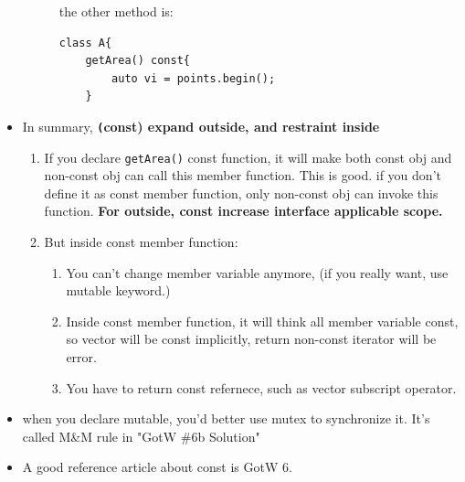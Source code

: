 \documentclass[a4paper,11pt,twoside]{book}
\begin{document}
\begin{itemize}
\begin{description}
		the other method is:	
\begin{lstlisting}[numbers=none]
class A{
	getArea() const{
		auto vi = points.begin();
    }
\end{lstlisting}
	
\end{description}
			
	\item In summary, \textbf{\texttt(const) expand outside, and restraint inside}
	\begin{enumerate}
		\item If you declare \texttt{getArea()} const function, it will make both const obj and non-const obj can call this member function. This is good. if you don't define it as const member function, only non-const obj can invoke this function. \textbf{For outside, const increase interface applicable scope.}
		
		\item But inside const member function:
		\begin{enumerate}
			\item You can't change member variable anymore, (if you really want, use mutable keyword.) 
			\item Inside const member function, it will think all member variable const, so vector will be const implicitly, return non-const iterator will be error.
			\item You have to return const refernece, such as vector subscript operator. 
		\end{enumerate}
	\end{enumerate}
	
	\item when you declare mutable, you'd better use mutex to synchronize it. It's called M\&M rule in "GotW \#6b Solution"
	\item A good reference article about const is GotW 6. 
\end{itemize}
		
		
\end{document}
